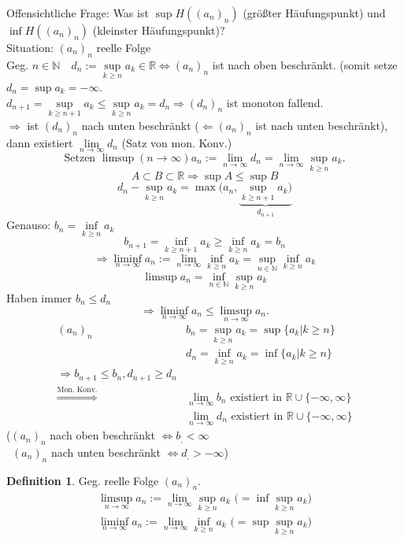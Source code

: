 \documentclass[12pt,a4paper,titlepage]{article} %
\theoremstyle{definition}
\newtheorem{defi}[satz]{Definition}
\theoremstyle{remark}
\newcommand{\N}{\mathbb{N}}
\newcommand{\R}{\mathbb{R}}
\newcommand{\limes}[1]{\lim\limits_{#1\rightarrow\infty}}
\begin{document}
Offensichtliche Frage: Was ist \( \sup H((a_n)_n) \) (größter Häufungspunkt) und \(  \inf H((a_n)_n) \) (kleinster Häufungspunkt)?\\
Situation: \((a_n)_n\) reelle Folge\\
Geg. \(n\in\N \quad d_n := \underset{k\geq n}{\sup}a_k \in \R \Leftrightarrow (a_n)_n\) ist nach oben beschränkt. (somit setze \(d_n = \sup a_k = -\infty \).\\
\( d_{n+1} = \underset{k\geq n+1}{\sup}a_k \leq \underset{k\geq n}{\sup}a_k = d_n \Longrightarrow (d_n)_n \) ist monoton fallend.\\
\( \Rightarrow \) ist \((d_n)_n\) nach unten beschränkt (\( \Leftarrow (a_n)_n \) ist nach unten beschränkt), dann existiert \( \limes{n} d_n \) (Satz von mon. Konv.)\\
\[\text{Setzen } \limsup\limits(n\rightarrow\infty) a_n := \limes{n} d_n = \limes{n} \underset{k\geq n}{\sup} a_k. \]
\[ A\subset B\subset \R \Rightarrow \sup A \leq \sup B \]
\[ d_n - \underset{k\geq n}{\sup} a_k = \max(a_n, \underbrace{\underset{k\geq n+1}{\sup} a_k)}_{d_{n+1}} \]
Genauso: \(b_n = \underset{k\geq n}{\inf} a_k \)
\[ b_{n+1} = \underset{k\geq n+1}{\inf} a_k \geq \underset{k\geq n}{\inf} a_k = b_n \]
\[ \Rightarrow \liminf\limits_{n\rightarrow\infty} a_n := \limes{n} \underset{k\geq n}{\inf} a_k = \underset{n\in\N}{\sup} \underset{k\geq n}{\inf} a_k \]
\[ \limsup a_n = \underset{n\in\N}{\inf} \underset{k\geq n}{\sup} a_k \]
Haben immer \(b_n \leq d_n\)
\[ \Rightarrow \liminf\limits_{n\rightarrow\infty} a_n \leq \limsup\limits_{n\rightarrow\infty} a_n. \]
\begin{align*}
	(a_n)_n &b_n = \underset{k\geq n}{\sup} a_k = \sup\{ a_k | k\geq n \}\\
	&d_n = \underset{k\geq n}{\inf} a_k = \inf\{ a_k | k\geq n \}\\
	\Rightarrow b_{n+1} \leq b_n, d_{n+1} \geq d_n\\
	\overset{\text{Mon. Konv.}}{\Rightarrow} &\limes{n} b_n \text{ existiert in }\R \cup \{-\infty, \infty\}\\
	&\limes{n} d_n \text{ existiert in }\R \cup \{-\infty, \infty\}
\end{align*}
(\((a_n)_n\) nach oben beschränkt \(\Leftrightarrow b_, < \infty \)\\\
\((a_n)_n\) nach unten beschränkt \(\Leftrightarrow d_, > -\infty \))
\begin{defi}
	Geg. reelle Folge \((a_n)_n\).\\
	\begin{align*}
		\limsup\limits_{n\rightarrow\infty} a_n := \limes{n}\underset{k\geq n}{\sup} a_k \text{ (}=\inf\underset{k\geq n}{\sup}a_k\text{)}\\
		\liminf\limits_{n\rightarrow\infty} a_n := \limes{n}\underset{k\geq n}{\inf} a_k \text{ (}=\sup\underset{k\geq n}{\sup}a_k\text{)}
	\end{align*}
\end{defi}
\end{document}
